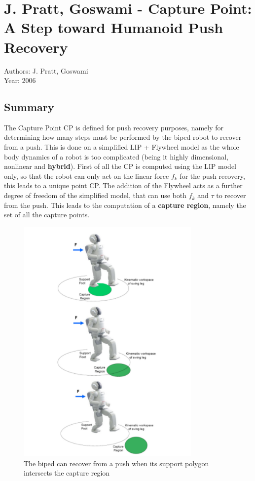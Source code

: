 \section{J. Pratt, Goswami - Capture Point: A Step toward Humanoid Push Recovery \cite{Pratt+CDG:2006}}
Authors: J. Pratt, Goswami\\
Year: 2006
\subsection*{Summary}
The Capture Point CP is defined for push recovery purposes, namely for determining how many steps must be performed by the biped robot to recover from a push. This is done on a simplified LIP +  Flywheel model as the whole body dynamics of a robot is too complicated (being it highly dimensional, nonlinear and \textbf{hybrid}). First of all the CP is computed using the LIP model only, so that the robot can only act on the linear force $f_k$ for the push recovery, this leads to a unique point CP. The addition of the Flywheel acts as a further degree of freedom of the simplified model, that can use both $f_k$ and $\tau$ to recover from the push. This leads to the computation of a \textbf{capture region}, namely the set of all the capture points.
\begin{figure}
  \centering
  \includegraphics[width=90mm]{CapturePoint}
  \caption{The biped can recover from a push when its support polygon intersects the capture region}
\end{figure}
